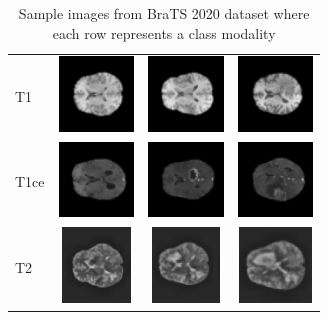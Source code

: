 \documentclass[10pt,journal,compsoc]{IEEEtran}
\begin{document}
\begin{table}[!t]
\renewcommand{\arraystretch}{1.3}
\centering
\caption{Sample images from BraTS 2020 dataset where each row represents a class modality}
\label{table:1}
\begin{tabular}{ M{1cm} M{2cm}  M{2cm}  M{2cm} }
T1 & \includegraphics[width=2cm, height=2cm]{t1_1.png} & \includegraphics[width=2cm, height=2cm]{t1_2.png} & \includegraphics[width=2cm, height=2cm]{t1_3.png} \\
T1ce & \includegraphics[width=2cm, height=2cm]{t1ce_1.png} & \includegraphics[width=2cm, height=2cm]{t1ce_2.png} & \includegraphics[width=2cm, height=2cm]{t1ce_3.png} \\
T2 & \includegraphics[width=2cm, height=2cm]{t2_1.png} & \includegraphics[width=2cm, height=2cm]{t2_2.png} & \includegraphics[width=2cm, height=2cm]{t2_3.png} \\

\end{tabular}
\end{table}
\end{document}
